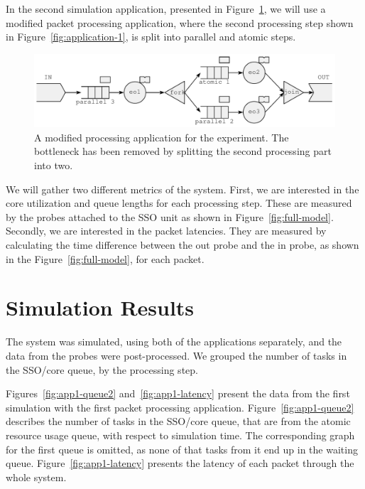 In the second simulation application, presented in Figure~\ref{fig:application-2}, we will use a modified packet processing application, where the second processing step shown in Figure~\ref{fig:application-1}, is split into parallel and atomic steps.

\begin{figure}[]
  \begin{center}
    \includegraphics[width=\textwidth]{images/application-2.pdf}
    \caption{A modified processing application for the experiment. The bottleneck has been removed by splitting the second processing part into two.}
    \label{fig:application-2}
  \end{center}
\end{figure}

We will gather two different metrics of the system. First, we are interested in the core utilization and queue lengths for each processing step. These are measured by the probes attached to the SSO unit as shown in Figure~\ref{fig:full-model}. Secondly, we are interested in the packet latencies. They are measured by calculating the time difference between the out probe and the in probe, as shown in the Figure~\ref{fig:full-model}, for each packet.

\section{Simulation Results}
\label{sec:simulation-results}

The system was simulated, using both of the applications separately, and the data from the probes were post-processed. We grouped the number of tasks in the SSO/core queue, by the processing step.

Figures~\ref{fig:app1-queue2} and~\ref{fig:app1-latency} present the data from the first simulation with the first packet processing application. Figure~\ref{fig:app1-queue2} describes the number of tasks in the SSO/core queue, that are from the atomic resource usage queue, with respect to simulation time. The corresponding graph for the first queue is omitted, as none of that tasks from it end up in the waiting queue. Figure~\ref{fig:app1-latency} presents the latency of each packet through the whole system.

